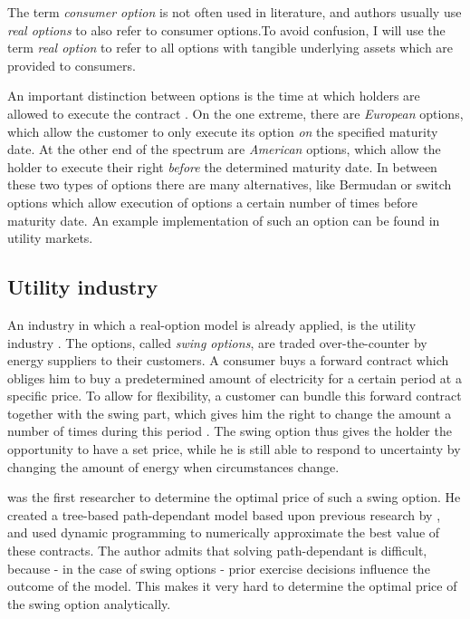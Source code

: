 The term \emph{consumer option} is not often used in literature, and authors usually use \emph{real options} to also refer to consumer options.To avoid confusion, I will use the term \emph{real option} to refer to all options with tangible underlying assets which are provided to consumers.

An important distinction between options is the time at which holders are allowed to execute the contract \cite{hull99}. On the one extreme, there are \emph{European} options, which allow the customer to only execute its option \emph{on} the specified maturity date. At the other end of the spectrum are \emph{American} options, which allow the holder to execute their right \emph{before} the determined maturity date. In between these two types of options there are many alternatives, like Bermudan or switch options which allow execution of options a certain number of times before maturity date. An example implementation of such an option can be found in utility markets.

\subsection{Utility industry}
An industry in which a real-option model is already applied, is the utility industry \cite{keppo2004pricing}. The options, called \emph{swing options}, are traded over-the-counter by energy suppliers to their customers. A consumer buys a forward contract which obliges him to buy a predetermined amount of electricity for a certain period at a specific price. To allow for flexibility, a customer can bundle this forward contract together with the swing part, which gives him the right to change the amount a number of times during this period \cite{jaillet2004valuation}. The swing option thus gives the holder the opportunity to have a set price, while he is still able to respond to uncertainty by changing the amount of energy when circumstances change.

 was the first researcher to determine the optimal price of such a swing option. He created a tree-based path-dependant  model based upon previous research by , and used dynamic programming to numerically approximate the best value of these contracts. The author admits that solving path-dependant is difficult, because - in the case of swing options - prior exercise decisions influence the outcome of the model. This makes it very hard to determine the optimal price of the swing option analytically.

